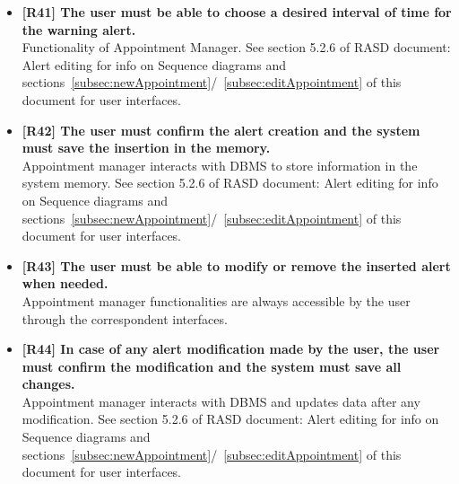 \begin{itemize}
\item \textbf{[R41] The user must be able to choose a desired interval of time for the warning alert.}\\
Functionality of Appointment Manager. See section 5.2.6 of RASD document: Alert editing for info on Sequence diagrams and sections~\ref{subsec:newAppointment}/~\ref{subsec:editAppointment} of this document for user interfaces.

\item \textbf{[R42] The user must confirm the alert creation and the system must save the insertion in the memory.}\\
Appointment manager interacts with DBMS to store information in the system memory. See section 5.2.6 of RASD document: Alert editing for info on Sequence diagrams and sections~\ref{subsec:newAppointment}/~\ref{subsec:editAppointment} of this document for user interfaces.

\item \textbf{[R43] The user must be able to modify or remove the inserted alert when needed.}\\
Appointment manager functionalities are always accessible by the user through the correspondent interfaces.

\item \textbf{[R44] In case of any alert modification made by the user, the user must confirm the modification
and the system must save all changes.}\\
Appointment manager interacts with DBMS and updates data after any modification. See section 5.2.6 of RASD document: Alert editing for info on Sequence diagrams and sections~\ref{subsec:newAppointment}/~\ref{subsec:editAppointment} of this document for user interfaces.
\end{itemize}

